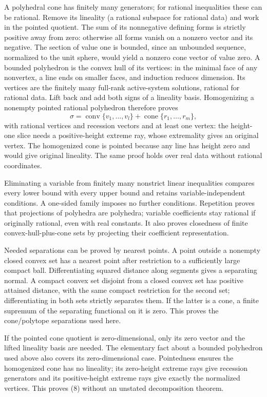 \documentclass[
  11pt,
]{article}
\begin{document}
A polyhedral cone has finitely many generators; for rational
inequalities these can be rational. Remove its lineality (a rational
subspace for rational data) and work in the pointed quotient. The sum of
its nonnegative defining forms is strictly positive away from zero:
otherwise all forms vanish on a nonzero vector and its negative. The
section of value one is bounded, since an unbounded sequence, normalized
to the unit sphere, would yield a nonzero cone vector of value zero. A
bounded polyhedron is the convex hull of its vertices: in the minimal
face of any nonvertex, a line ends on smaller faces, and induction
reduces dimension. Its vertices are the finitely many full-rank
active-system solutions, rational for rational data. Lift back and add
both signs of a lineality basis. Homogenizing a nonempty pointed
rational polyhedron therefore proves \[
 \sigma=\operatorname{conv}\{v_1,\ldots,v_l\}
                    +\operatorname{cone}\{r_1,\ldots,r_m\},     \tag{8}
\] with rational vertices and recession vectors and at least one vertex:
the height-one slice needs a positive-height extreme ray, whose
extremality gives an original vertex. The homogenized cone is pointed
because any line has height zero and would give original lineality. The
same proof holds over real data without rational coordinates.

Eliminating a variable from finitely many nonstrict linear inequalities
compares every lower bound with every upper bound and retains
variable-independent conditions. A one-sided family imposes no further
conditions. Repetition proves that projections of polyhedra are
polyhedra; variable coefficients stay rational if originally rational,
even with real constants. It also proves closedness of finite
convex-hull-plus-cone sets by projecting their coefficient
representation.

Needed separations can be proved by nearest points. A point outside a
nonempty closed convex set has a nearest point after restriction to a
sufficiently large compact ball. Differentiating squared distance along
segments gives a separating normal. A compact convex set disjoint from a
closed convex set has positive attained distance, with the same compact
restriction for the second set; differentiating in both sets strictly
separates them. If the latter is a cone, a finite supremum of the
separating functional on it is zero. This proves the cone/polytope
separations used here.

If the pointed cone quotient is zero-dimensional, only its zero vector
and the lifted lineality basis are needed. The elementary fact about a
bounded polyhedron used above also covers its zero-dimensional case.
Pointedness ensures the homogenized cone has no lineality; its
zero-height extreme rays give recession generators and its
positive-height extreme rays give exactly the normalized vertices. This
proves (8) without an unstated decomposition theorem.
\end{document}
